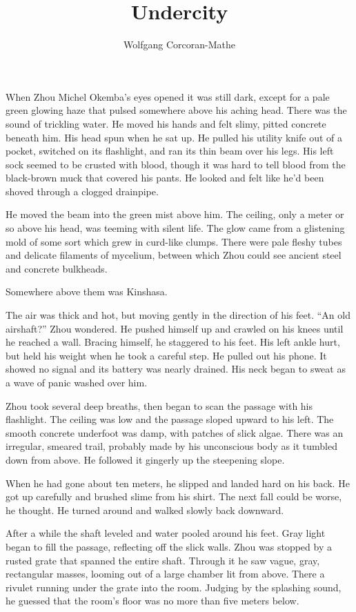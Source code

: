 \documentclass[10pt,a4paper]{article}
\begin{document}
\title{Undercity}
\author{Wolfgang Corcoran-Mathe}
\date{}
\maketitle

When Zhou Michel Okemba's eyes opened it was still dark, except for
a pale green glowing haze that pulsed somewhere above his aching
head. There was the sound of trickling water. He moved his hands
and felt slimy, pitted concrete beneath him. His head spun when he
sat up. He pulled his utility knife out of a pocket, switched on
its flashlight, and ran its thin beam over his legs. His left sock
seemed to be crusted with blood, though it was hard to tell blood
from the black-brown muck that covered his pants. He looked and
felt like he'd been shoved through a clogged drainpipe.

He moved the beam into the green mist above him. The ceiling, only a
meter or so above his head, was teeming with silent life. The glow
came from a glistening mold of some sort which grew in curd-like
clumps. There were pale fleshy tubes and delicate filaments of
mycelium, between which Zhou could see ancient steel and concrete
bulkheads.

Somewhere above them was Kinshasa.

The air was thick and hot, but moving gently in the direction of
his feet. ``An old airshaft?'' Zhou wondered. He pushed himself up
and crawled on his knees until he reached a wall. Bracing himself,
he staggered to his feet. His left ankle hurt, but held his weight
when he took a careful step. He pulled out his phone. It showed
no signal and its battery was nearly drained. His neck began to
sweat as a wave of panic washed over him.

Zhou took several deep breaths, then began to scan the passage with
his flashlight. The ceiling was low and the passage sloped upward
to his left. The smooth concrete underfoot was damp, with patches
of slick algae. There was an irregular, smeared trail, probably
made by his unconscious body as it tumbled down from above. He
followed it gingerly up the steepening slope.

When he had gone about ten meters, he slipped and landed hard on
his back. He got up carefully and brushed slime from his shirt. The
next fall could be worse, he thought. He turned around and walked
slowly back downward.

After a while the shaft leveled and water pooled around his
feet. Gray light began to fill the passage, reflecting off the slick
walls. Zhou was stopped by a rusted grate that spanned the entire
shaft. Through it he saw vague, gray, rectangular masses, looming
out of a large chamber lit from above. There a rivulet running
under the grate into the room. Judging by the splashing sound,
he guessed that the room's floor was no more than five meters below.
\end{document}
